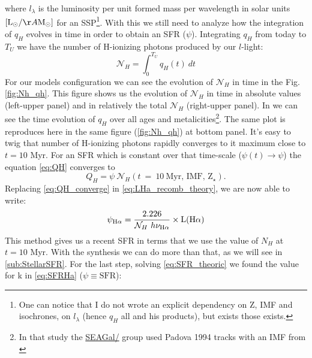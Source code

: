 \documentclass[a4paper,11pt]{article}
\begin{document}
\noindent where $l_\lambda$ is the luminosity per unit formed mass per wavelength in solar units $[\textrm{L}_\odot/\AA\textrm{M}_\odot]$ for an SSP\footnote{One can notice that I do not wrote an explicit dependency on Z, IMF and isochrones, on $l_\lambda$ (hence $q_H$ all and his products), but exists those exists.}. With this we still need to analyze how the integration of $q_H$ evolves in time in order to obtain an SFR ($\psi$). Integrating $q_H$ from today to $T_U$ we have the number of H-ionizing photons produced by our $l$-light:
\begin{equation}
	\mathcal{N}_H = \int_0^{T_U} q_H(t)\ dt
\end{equation}
For our models configuration we can see the evolution of $\mathcal{N}_H$ in time in the Fig. \ref{fig:Nh_qh}. This figure shows us the evolution of $\mathcal{N}_H$ in time in absolute values (left-upper panel) and in relatively the total $\mathcal{N}_H$ (right-upper panel). In \citet[Fig. 2b]{CidFernandes.etal.2011a} we can see the time evolution of $q_H$ over all ages and metalicities\footnote{In that study the \href{http://starlight.ufsc.br}{SEAGal/\STARLIGHT} group used Padova 1994 tracks with an IMF from \citet{Chabrier.2003a}}. The same plot is reproduces here in the same figure (\ref{fig:Nh_qh}) at bottom panel. It's easy to twig that number of H-ionizing photons rapidly converges to it maximum close to $t = 10$ Myr. For an SFR which is constant over that time-scale ($\psi(t) \rightarrow \psi$) the equation \eqref{eq:QH} converges to
\begin{equation}
	Q_H = \psi\ \mathcal{N}_H(t\ =\ 10\ \textrm{Myr, IMF, Z}{}_\star).
	\label{eq:QH_converge}
\end{equation}
\noindent Replacing \eqref{eq:QH_converge} in \eqref{eq:LHa_recomb_theory}, we are now able to write:
\begin{equation}
	\psi_{\Halpha} = \frac{2.226}{\mathcal{N}_H\ h \nu_{\Halpha}} \times \mathrm{L}(\Halpha)
	\label{eq:SFR_theoric}
\end{equation}
\noindent This method gives us a recent SFR in terms that we use the value of $N_H$ at $t = 10$ Myr. With the \starlight synthesis we can do more than that, as we will see in \ref{sub:StellarSFR}. For the last step, solving \eqref{eq:SFR_theoric} we found the value for k in \eqref{eq:SFRHa} ($\psi \equiv \mathrm{SFR}$):
\end{document}
